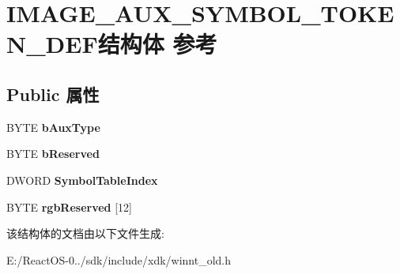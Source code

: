 \hypertarget{struct_i_m_a_g_e___a_u_x___s_y_m_b_o_l___t_o_k_e_n___d_e_f}{}\section{I\+M\+A\+G\+E\+\_\+\+A\+U\+X\+\_\+\+S\+Y\+M\+B\+O\+L\+\_\+\+T\+O\+K\+E\+N\+\_\+\+D\+E\+F结构体 参考}
\label{struct_i_m_a_g_e___a_u_x___s_y_m_b_o_l___t_o_k_e_n___d_e_f}
\subsection*{Public 属性}
\begin{DoxyCompactItemize}
\item 
\mbox{\label{struct_i_m_a_g_e___a_u_x___s_y_m_b_o_l___t_o_k_e_n___d_e_f_a89152df9edd01b3ad1003baf93be8b70}} 
B\+Y\+TE {\bfseries b\+Aux\+Type}
\item 
\mbox{\label{struct_i_m_a_g_e___a_u_x___s_y_m_b_o_l___t_o_k_e_n___d_e_f_a3c80fc02e0eaada4ffc0d1e902d3ff4c}} 
B\+Y\+TE {\bfseries b\+Reserved}
\item 
\mbox{\label{struct_i_m_a_g_e___a_u_x___s_y_m_b_o_l___t_o_k_e_n___d_e_f_a2876620c0fc3a2a5edc1f77a3f1b6e2c}} 
D\+W\+O\+RD {\bfseries Symbol\+Table\+Index}
\item 
\mbox{\label{struct_i_m_a_g_e___a_u_x___s_y_m_b_o_l___t_o_k_e_n___d_e_f_ab46422467a069963b8ee5ed271eaa859}} 
B\+Y\+TE {\bfseries rgb\+Reserved} \mbox{[}12\mbox{]}
\end{DoxyCompactItemize}


该结构体的文档由以下文件生成\+:\begin{DoxyCompactItemize}
\item 
E\+:/\+React\+O\+S-\/0../sdk/include/xdk/winnt\+\_\+old.\+h\end{DoxyCompactItemize}

